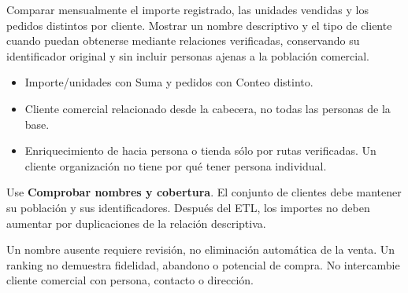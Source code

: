 \label{aw03}
\begin{goal}
Comparar mensualmente el importe registrado, las unidades vendidas y los pedidos distintos por cliente. Mostrar un nombre descriptivo y el tipo de cliente cuando puedan obtenerse mediante relaciones verificadas, conservando su identificador original y sin incluir personas ajenas a la población comercial.
\end{goal}
\begin{itemize}
\item Importe/unidades con Suma y pedidos con Conteo distinto.
\item Cliente comercial relacionado desde la cabecera, no todas las personas de la base.
\item Enriquecimiento de  hacia persona o tienda sólo por rutas verificadas. Un cliente organización no tiene por qué tener persona individual.
\end{itemize}
\begin{good}
Use \textbf{Comprobar nombres y cobertura}. El conjunto de clientes debe mantener su población y sus identificadores. Después del ETL, los importes no deben aumentar por duplicaciones de la relación descriptiva.
\end{good}
\begin{note}
Un nombre ausente requiere revisión, no eliminación automática de la venta. Un ranking no demuestra fidelidad, abandono o potencial de compra. No intercambie cliente comercial con persona, contacto o dirección.
\end{note}

